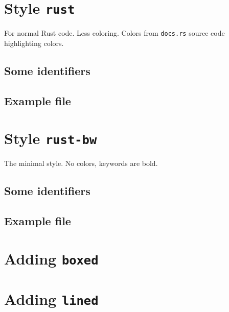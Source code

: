 \documentclass[DIV13]{scrartcl}
\begin{document}
\clearpage
\section*{Style \texttt{rust}}

For normal Rust code. Less coloring. Colors from \texttt{docs.rs} source code
highlighting colors.

\subsection*{Some identifiers}


\clearpage
\subsection*{Example file}



\clearpage
\section*{Style \texttt{rust-bw}}

The minimal style. No colors, keywords are bold.

\subsection*{Some identifiers}


\clearpage
\subsection*{Example file}



\clearpage
\section*{Adding \texttt{boxed}}



\clearpage
\section*{Adding \texttt{lined}}

\end{document}
